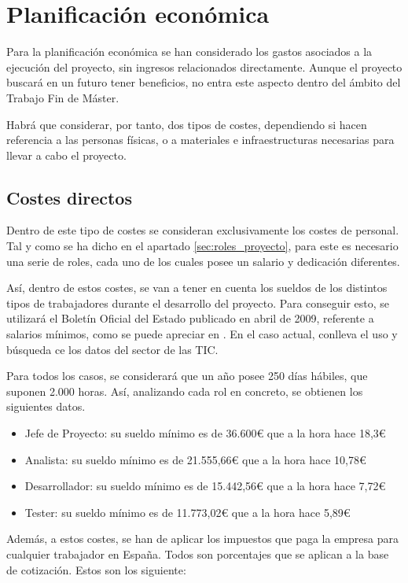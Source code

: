 \section{Planificación económica}\label{sec:planificacion_economica}

Para la planificación económica se han considerado los gastos asociados a la ejecución del proyecto, sin ingresos relacionados directamente. Aunque el proyecto buscará en un futuro tener beneficios, no entra este aspecto dentro del ámbito del Trabajo Fin de Máster.

Habrá que considerar, por tanto, dos tipos de costes, dependiendo si hacen referencia a las personas físicas, o a materiales e infraestructuras necesarias para llevar a cabo el proyecto.

\subsection{Costes directos}
Dentro de este tipo de costes se consideran exclusivamente los costes de personal. Tal y como se ha dicho en el apartado \ref{sec:roles_proyecto}, para este es necesario una serie de roles, cada uno de los cuales posee un salario y dedicación diferentes.

Así, dentro de estos costes, se van a tener en cuenta los sueldos de los distintos tipos de trabajadores durante el desarrollo del proyecto. Para conseguir esto, se utilizará el Boletín Oficial del Estado publicado en abril de 2009, referente a salarios mínimos, como se puede apreciar en . En el caso actual, conlleva el uso y búsqueda ce los datos del sector de las TIC.

Para todos los casos, se considerará que un año posee 250 días hábiles, que suponen 2.000 horas. Así, analizando cada rol en concreto, se obtienen los siguientes datos.

\begin{itemize}
    \item Jefe de Proyecto: su sueldo mínimo es de 36.600€ que a la hora hace 18,3€
    \item Analista: su sueldo mínimo es de 21.555,66€ que a la hora hace 10,78€
    \item Desarrollador: su sueldo mínimo es de 15.442,56€ que a la hora hace 7,72€
    \item Tester: su sueldo mínimo es de 11.773,02€ que a la hora hace 5,89€
\end{itemize}

Además, a estos costes, se han de aplicar los impuestos que paga la empresa para cualquier trabajador en España. Todos son porcentajes que se aplican a la base de cotización. Estos son los siguiente:

